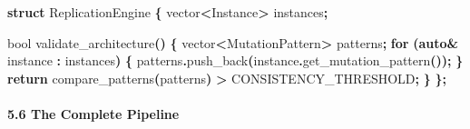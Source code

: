 \documentclass[
  11pt,
  a4paper,
]{article}
\newenvironment{Shaded}{\begin{snugshade}}{\end{snugshade}}
\newcommand{\ControlFlowTok}[1]{\textcolor[rgb]{0.13,0.29,0.53}{\textbf{#1}}}
\newcommand{\DataTypeTok}[1]{\textcolor[rgb]{0.13,0.29,0.53}{#1}}
\newcommand{\KeywordTok}[1]{\textcolor[rgb]{0.13,0.29,0.53}{\textbf{#1}}}
\newcommand{\NormalTok}[1]{#1}
\newcommand{\OperatorTok}[1]{\textcolor[rgb]{0.81,0.36,0.00}{\textbf{#1}}}
\begin{document}
\begin{Shaded}
\begin{Highlighting}[]
\KeywordTok{struct}\NormalTok{ ReplicationEngine }\OperatorTok{\{}
\NormalTok{    vector}\OperatorTok{\textless{}}\NormalTok{Instance}\OperatorTok{\textgreater{}}\NormalTok{ instances}\OperatorTok{;}
    
    \DataTypeTok{bool}\NormalTok{ validate\_architecture}\OperatorTok{()} \OperatorTok{\{}
\NormalTok{        vector}\OperatorTok{\textless{}}\NormalTok{MutationPattern}\OperatorTok{\textgreater{}}\NormalTok{ patterns}\OperatorTok{;}
        \ControlFlowTok{for} \OperatorTok{(}\KeywordTok{auto}\OperatorTok{\&}\NormalTok{ instance }\OperatorTok{:}\NormalTok{ instances}\OperatorTok{)} \OperatorTok{\{}
\NormalTok{            patterns}\OperatorTok{.}\NormalTok{push\_back}\OperatorTok{(}\NormalTok{instance}\OperatorTok{.}\NormalTok{get\_mutation\_pattern}\OperatorTok{());}
        \OperatorTok{\}}
        \ControlFlowTok{return}\NormalTok{ compare\_patterns}\OperatorTok{(}\NormalTok{patterns}\OperatorTok{)} \OperatorTok{\textgreater{}}\NormalTok{ CONSISTENCY\_THRESHOLD}\OperatorTok{;}
    \OperatorTok{\}}
\OperatorTok{\};}
\end{Highlighting}
\end{Shaded}

\paragraph{5.6 The Complete Pipeline}\label{the-complete-pipeline}
\end{document}

